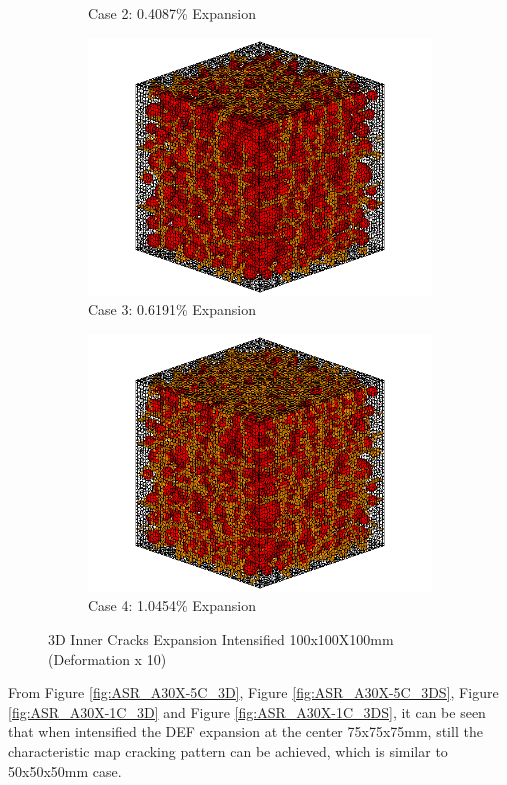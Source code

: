 \begin{figure}[ht!]
\begin{subfigure}{.5\textwidth}
    \caption{Case 2: 0.4087\% Expansion}
    \end{subfigure}%
    \begin{subfigure}{.5\textwidth}
      \centering
      \includegraphics[width=.8\linewidth]{Files/exp_3D/DEF/A30X-1C_3_c.png}
    \caption{Case 3: 0.6191\% Expansion}
    \end{subfigure}
    \begin{subfigure}{.5\textwidth}
      \centering
      \includegraphics[width=.8\linewidth]{Files/exp_3D/DEF/A30X-1C_4_c.png}
    \caption{Case 4: 1.0454\% Expansion}
    \end{subfigure}%

  \caption{3D Inner Cracks Expansion Intensified 100x100X100mm (Deformation x 10)}
  \label{fig:DEF_A30X-1C_3D}
\end{figure}


From Figure \ref{fig:ASR_A30X-5C_3D}, Figure \ref{fig:ASR_A30X-5C_3DS}, Figure \ref{fig:ASR_A30X-1C_3D} and Figure \ref{fig:ASR_A30X-1C_3DS}, it can be seen that when intensified the DEF expansion at the center 75x75x75mm, still the characteristic map cracking pattern can be achieved, which is similar to 50x50x50mm case.

